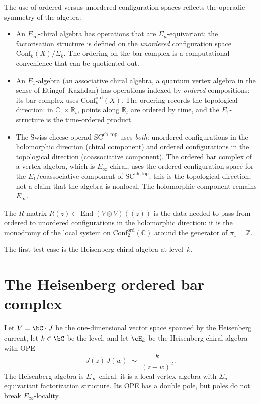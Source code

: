 \begin{remark}
\label{rem:why-ordered-spaces}
The use of ordered versus unordered configuration spaces
reflects the operadic symmetry of the algebra:
\begin{itemize}
\item An $E_\infty$-chiral algebra has operations that are
 $\Sigma_n$-equivariant:
 the factorisation structure is defined on the \emph{unordered}
 configuration space $\mathrm{Conf}_k(X)/\Sigma_k$. The
 ordering on the bar complex is a computational convenience
 that can be quotiented out.
\item An $E_1$-algebra (an associative chiral algebra, a
 quantum vertex algebra in the sense of Etingof--Kazhdan)
 has operations indexed by \emph{ordered} compositions:
 its bar complex uses
 $\mathrm{Conf}_k^{\mathrm{ord}}(X)$. The ordering
 records the topological direction: in
 $\mathbb C_z\times\mathbb R_t$, points along
 $\mathbb R_t$ are ordered by time, and the
 $E_1$-structure is the time-ordered product.
\item The Swiss-cheese operad $\mathrm{SC}^{\mathrm{ch,top}}$
 uses \emph{both}: unordered configurations in the
 holomorphic direction (chiral component) and ordered
 configurations in the topological direction (coassociative component).
 The ordered bar complex of a vertex algebra, which is
 $E_\infty$-chiral, uses the ordered configuration space
 for the $E_1$/coassociative component of $\mathrm{SC}^{\mathrm{ch,top}}$;
 this is the topological direction, not a claim that the
 algebra is nonlocal. The holomorphic component remains
 $E_\infty$.
\end{itemize}
The $R$-matrix $R(z)\in\operatorname{End}(V\otimes V)(\!(z)\!)$
is the data needed to pass from ordered to unordered
configurations in the holomorphic direction: it is the
monodromy of the local system on
$\mathrm{Conf}_2^{\mathrm{ord}}(\mathbb C)$ around the
generator of $\pi_1=\mathbb Z$.
\end{remark}

\bigskip
The first test case is the Heisenberg chiral algebra at level~$k$.

\section{The Heisenberg ordered bar complex}
\label{subsec:heisenberg-ordered-bar}

Let $V = \bC\cdot J$ be the one-dimensional vector space spanned by
the Heisenberg current, let $k\in\bC$ be the level, and let $\cH_k$
be the Heisenberg chiral algebra with OPE
\begin{equation}\label{eq:heisenberg-ope-ordered}
J(z)\,J(w) \;\sim\; \frac{k}{(z-w)^2}.
\end{equation}
The Heisenberg algebra is $E_\infty$-chiral: it is a local vertex
algebra with $\Sigma_n$-equivariant factorization structure. Its OPE
has a double pole, but poles do not break $E_\infty$-locality.

